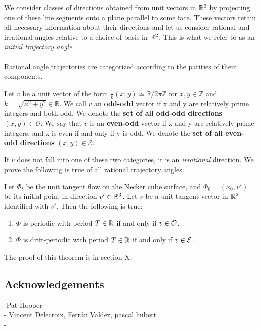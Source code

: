 \documentclass[]{article}
\begin{document}
\begin{figure}

\end{figure}
We consider classes of directions obtained from unit vectors in $\mathbb{R}^3$ by projecting one of these line segments onto a plane parallel to some face. These vectors retain all necessary information about their directions and let us consider rational and irrational angles relative to a choice of basis in $\mathbb{R}^2$. This is what we refer to as an \emph{initial trajectory angle}.
\\\\
Rational angle trajectories are categorized according to the parities of their components.
\begin{Def}
Let $v$ be a unit vector of the form $\frac{1}{k}(x,y)\simeq\mathbb{R}/2\pi\mathbb{Z}$ for $x,y\in\mathbb{Z}$ and $k=\sqrt{x^2+y^2}\in\mathbb{R}$.  We call $v$ an \textbf{odd-odd} vector if x and y are relatively prime integers and both odd. We denote the \textbf{set of all odd-odd directions} $(x,y)\in\mathcal{O}$. We say that $v$ is an \textbf{even-odd} vector if x and y are relatively prime integers, and x is even if and only if y is odd. We denote the \textbf{set of all even-odd directions} $(x,y)\in\mathcal{E}$.
\end{Def}
If $v$ does not fall into one of these two categories, it is an \emph{irrational} direction. We prove the following is true of all rational trajectory angles:

\begin{thm}
Let $\Phi_t$ be the unit tangent flow on the Necker cube surface, and $\Phi_0=(x_0,v')$ be its initial point in direction $v'\in\mathbb{R}^3$.  Let $v$ be a unit tangent vector in $\mathbb{R}^2$ identified with $v'$. Then the following is true:
\begin{enumerate}[label=(\roman*)]
\item $\Phi$ is periodic with period $T\in\mathbb{R}$ if and only if $v\in\mathcal{O}$.
\item $\Phi$ is drift-periodic with period $T\in\mathbb{R}$ if and only if $v\in\mathcal{E}$.
\end{enumerate}
\end{thm}

The proof of this theorem is in section X.
\\

\subsection{Acknowledgements}
-Pat Hooper\\
- Vincent Delecroix, Ferrán Valdez, pascal hubert\\
- \\
\end{document}
